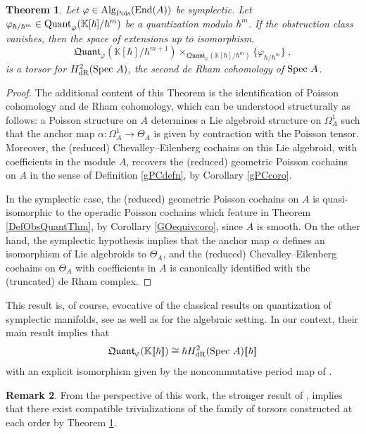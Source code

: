 \documentclass[11pt]{amsart}
\numberwithin{equation}{section}
\newtheorem{theo}{Theorem}[section]
\theoremstyle{definition}
\newtheorem{rmk}[theo]{Remark}
\newcommand{\bb}{\mathbb}
\newcommand{\fph}{{[\![\hbar]\!]}}
\newcommand{\K}{{\bb K}}
\newcommand{\ik}{{\bb K}}
\newcommand{\End}{{\textup{End}}}
\newcommand{\Spec}{{\textup{Spec\ }}}
\newcommand{\Quant}{{\textup{Quant}}}
\newcommand{\fQuant}{{\mathfrak{Quant}}}
\newcommand{\dR}{{\textup{dR}}}
\newcommand{\Alg}{{\textup{Alg}}}
\newcommand{\Pois}{{\textup{Pois}}}
\newcommand{\0}{{\textbf{0}}}
\begin{document}
\begin{theo}\label{QuantdRthm}
Let $\varphi\in \Alg_{\Pois}(\End(A))$ be symplectic. Let $\varphi_{\hbar/\hbar^m}\in \Quant_\varphi(\ik[\hbar]/\hbar^m)$ be a quantization modulo $\hbar^m$. If the obstruction class vanishes, then the space of extensions up to isomorphism,
\[  
	\fQuant_\varphi(\K[\hbar]/\hbar^{m+1}) \times_{\fQuant_\varphi(\K[\hbar]/\hbar^{m}) } \{\varphi_{\hbar/\hbar^{m}} \} \ , 
\]
is a torsor for $H^2_{\dR}(\Spec A)$, the second de Rham cohomology of $\Spec A$.
\end{theo}
\begin{proof}
 The additional content of this Theorem is the identification of Poisson cohomology and de Rham cohomology, which can be understood structurally as follows: a Poisson structure on $A$ determines a Lie algebroid structure on $\Omega^1_A$ such that the anchor map $\alpha:\Omega^1_A\to \Theta_A$ is given by contraction with the Poisson tensor. Moreover, the (reduced) Chevalley--Eilenberg cochains on this Lie algebroid, with coefficients in the module $A$, recovers the (reduced) geometric Poisson cochains on $A$ in the sense of Definition \ref{gPCdefn}, by Corollary \ref{gPCcoro}.
 
 
 In the symplectic case, the (reduced) geometric Poisson cochains on $A$ is quasi-isomorphic to the operadic Poisson cochains which feature in Theorem \ref{DefObsQuantThm}, by Corollary \ref{GOequivcoro}, since $A$ is smooth. On the other hand, the symplectic hypothesis implies that the anchor map $\alpha$ defines an isomorphism of Lie algebroids to $\Theta_A$, and the (reduced) Chevalley--Eilenberg cochains on $\Theta_A$ with coefficients in $A$ is canonically identified with the (truncated) de Rham complex.
 
 
 
 
\end{proof}

This result is, of course, evocative of the classical results on quantization of symplectic manifolds, see \cite{LecomteWilde83, Fedosov1994, Kontsevich1997} as well as \cite{BeK} for the algebraic setting. In our context, their main result implies that
\begin{equation}
	\fQuant_\varphi(\ik\fph) \cong \hbar H^2_{\dR}(\Spec{A})\fph
\end{equation}
with an explicit isomorphism given by the noncommutative period map of \cite{BeK}.

\begin{rmk}
From the perspective of this work, the stronger result of \cite{BeK}, implies that there exist compatible trivializations of the family of torsors constructed at each order by Theorem \ref{QuantdRthm}.
\end{rmk}
\end{document}
